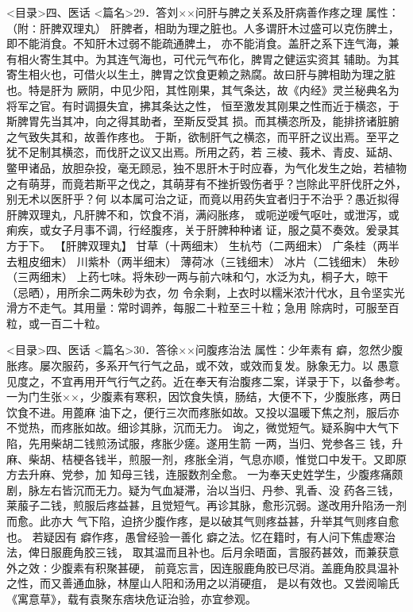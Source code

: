 \documentclass[a4paper,12pt,UTF8,twoside]{ctexbook}
\begin{document}
<目录>四、医话
<篇名>29．答刘××问肝与脾之关系及肝病善作疼之理
属性：（附∶肝脾双理丸） 
肝脾者，相助为理之脏也。人多谓肝木过盛可以克伤脾土，即不能消食。不知肝木过弱不能疏通脾土， 
亦不能消食。盖肝之系下连气海，兼有相火寄生其中。为其连气海也，可代元气布化，脾胃之健运实资其 
辅助。为其寄生相火也，可借火以生土，脾胃之饮食更赖之熟腐。故曰肝与脾相助为理之脏也。特是肝为 
厥阴，中见少阳，其性刚果，其气条达，故《内经》灵兰秘典名为将军之官。有时调摄失宜，拂其条达之性， 
恒至激发其刚果之性而近于横恣，于斯脾胃先当其冲，向之得其助者，至斯反受其 
损。而其横恣所及，能排挤诸脏腑之气致失其和，故善作疼也。 
于斯，欲制肝气之横恣，而平肝之议出焉。至平之犹不足制其横恣，而伐肝之议又出焉。所用之药，若 
三棱、莪术、青皮、延胡、鳖甲诸品，放胆杂投，毫无顾忌，独不思肝木于时应春，为气化发生之始，若植物 
之有萌芽，而竟若斯平之伐之，其萌芽有不挫折毁伤者乎？岂除此平肝伐肝之外，别无术以医肝乎？何 
以本属可治之证，而竟以用药失宜者归于不治乎？愚近拟得肝脾双理丸，凡肝脾不和，饮食不消，满闷胀疼， 
或呃逆嗳气呕吐，或泄泻，或痢疾，或女子月事不调，行经腹疼，关于肝脾种种诸 
证，服之莫不奏效。爰录其方于下。 
【肝脾双理丸】 
甘草（十两细末） 生杭芍（二两细末） 广条桂（两半去粗皮细末） 川紫朴（两半细末） 
薄荷冰（三钱细末） 冰片（二钱细末） 朱砂（三两细末） 
上药七味。将朱砂一两与前六味和勺，水泛为丸，桐子大，晾干（忌晒），用所余二两朱砂为衣，勿 
令余剩，上衣时以糯米浓汁代水，且令坚实光滑方不走气。其用量∶常时调养，每服二十粒至三十粒；急用 
除病时，可服至百粒，或一百二十粒。 

<目录>四、医话
<篇名>30．答徐××问腹疼治法
属性：少年素有 癖，忽然少腹胀疼。屡次服药，多系开气行气之品，或不效，或效而复发。脉象无力。以 
愚意见度之，不宜再用开气行气之药。近在奉天有治腹疼二案，详录于下，以备参考。 
一为门生张××，少腹素有寒积，因饮食失慎，肠结，大便不下，少腹胀疼，两日饮食不进。用蓖麻 
油下之，便行三次而疼胀如故。又投以温暖下焦之剂，服后亦不觉热，而疼胀如故。细诊其脉，沉而无力。 
询之，微觉短气。疑系胸中大气下陷，先用柴胡二钱煎汤试服，疼胀少瘥。遂用生箭 一两，当归、党参各三 
钱，升麻、柴胡、桔梗各钱半，煎服一剂，疼胀全消，气息亦顺，惟觉口中发干。又即原方去升麻、党参，加 
知母三钱，连服数剂全愈。 
一为奉天史姓学生，少腹疼痛颇剧，脉左右皆沉而无力。疑为气血凝滞，治以当归、丹参、乳香、没 
药各三钱，莱菔子二钱，煎服后疼益甚，且觉短气。再诊其脉，愈形沉弱。遂改用升陷汤一剂而愈。此亦大 
气下陷，迫挤少腹作疼，是以破其气则疼益甚，升举其气则疼自愈也。 
若疑因有 癖作疼，愚曾经验一善化 癖之法。忆在籍时，有人问下焦虚寒治法，俾日服鹿角胶三钱， 
取其温而且补也。后月余晤面，言服药甚效，而兼获意外之效∶少腹素有积聚甚硬， 
前竟忘言，因连服鹿角胶已尽消。盖鹿角胶具温补之性，而又善通血脉，林屋山人阳和汤用之以消硬疽， 
是以有效也。又尝阅喻氏《寓意草》，载有袁聚东痞块危证治验，亦宜参观。 
\end{document}
